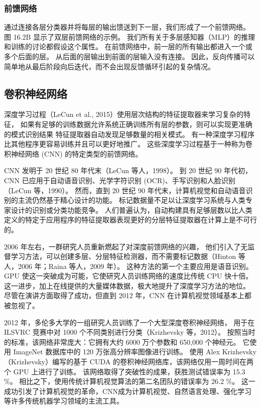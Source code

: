 \subsubsection{前馈网络}
通过连接各层分类器并将每层的输出馈送到下一层，我们形成了一个前馈网络。 图 16.2B 显示了双层前馈网络的示例。 
我们所有关于多层感知器（MLP）的推理和训练的讨论都假设这个属性。 在前馈网络中，前一层的所有输出都进入一个或多个后面的层。 
从后面的层输出到前面的层输入没有连接。 因此，反向传播可以简单地从最后阶段向后迭代，而不会出现反馈循环引起的复杂情况。

\subsection{卷积神经网络}
深度学习过程（LeCun et al., 2015）使用层次结构的特征提取器来学习复杂的特征，
如果有足够的训练数据允许系统正确训练所有层的参数，则可以实现更准确的模式识别结果 特征提取器自动发现足够数量的相关模式。 
有一种深度学习程序比其他程序更容易训练并且可以更好地推广。 
这些深度学习过程基于一种称为卷积神经网络 (CNN) 的特定类型的前馈网络。

CNN 发明于 20 世纪 80 年代末（LeCun 等人，1998）。 
到 20 世纪 90 年代初，CNN 已应用于自动语音识别、光学字符识别 (OCR)、手写识别和人脸识别（LeCun 等，1990）。 
然而，直到 20 世纪 90 年代末，计算机视觉和自动语音识别的主流仍然基于精心设计的功能。 
标记数据量不足以让深度学习系统与人类专家设计的识别或分类功能竞争。 
人们普遍认为，自动构建具有足够层数以比人类定义的特定于应用程序的特征提取器表现更好的分层特征提取器在计算上是不可行的。

2006 年左右，一群研究人员重新燃起了对深度前馈网络的兴趣，
他们引入了无监督学习方法，可以创建多层、分层特征检测器，而不需要标记数据（Hinton 等人，2006 年；Raina 等人，2009 年）。 
这种方法的第一个主要应用是语音识别。 GPU 使这一突破成为可能，它使研究人员训练网络的速度比传统 CPU 快十倍。 
这一进步，加上在线提供的大量媒体数据，极大地提升了深度学习方法的地位。 
尽管在演讲方面取得了成功，但直到 2012 年，CNN 在计算机视觉领域基本上都被忽视了。

2012 年，多伦多大学的一组研究人员训练了一个大型深度卷积神经网络，
用于在 ILSVRC 竞赛中对 1000 个不同类别进行分类（Krizhevsky 等，2012）。 
按照当时的标准，该网络非常庞大：它拥有大约 6000 万个参数和 650,000 个神经元。 
它使用 ImageNet 数据库中的 120 万张高分辨率图像进行训练。 
使用 Alex Krizhevsky（Krizhevsky）编写的基于 CUDA 的卷积神经网络库，该网络仅用一周时间在两个 GPU 上进行了训练。 
该网络取得了突破性的成果，获胜测试错误率为 15.3 \%。 
相比之下，使用传统计算机视觉算法的第二名团队的错误率为 26.2 \%。 
这一成功引发了计算机视觉的革命，CNN成为计算机视觉、自然语言处理、强化学习等许多传统机器学习领域的主流工具。

